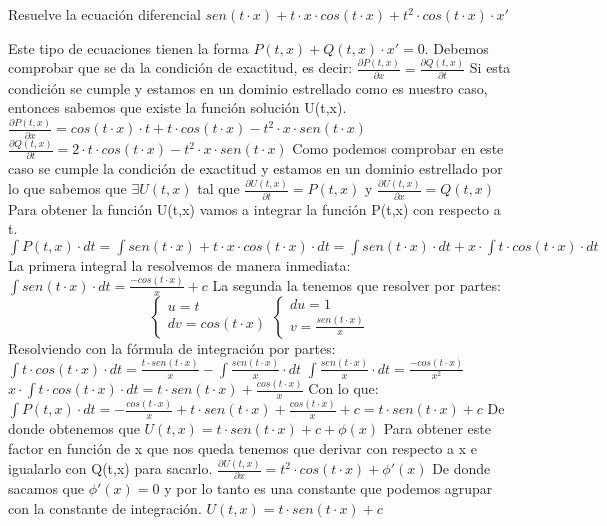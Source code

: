 \begin{ejer}
	Resuelve la ecuación diferencial $sen(t\cdot x) + t\cdot x\cdot cos(t\cdot x) + t^2\cdot cos(t\cdot x)\cdot x'$  
\end{ejer}
\begin{sol}
	Este tipo de ecuaciones tienen la forma $P(t,x) + Q(t,x)\cdot x' = 0$.  
	Debemos comprobar que se da la condición de exactitud, es decir:  
	$\frac{\partial P(t,x)}{\partial x} = \frac{\partial Q(t,x)}{\partial t}$  
	Si esta condición se cumple y estamos en un dominio estrellado como es nuestro caso, entonces sabemos que existe la función solución U(t,x).  
	$\frac{\partial P(t,x)}{\partial x} = cos(t\cdot x)\cdot t + t\cdot cos(t\cdot x) - t^2\cdot x\cdot sen(t\cdot x)$  
	$\frac{\partial Q(t,x)}{\partial t} = 2\cdot t\cdot cos(t\cdot x) - t^2\cdot x\cdot sen(t\cdot x)$  
	Como podemos comprobar en este caso se cumple la condición de exactitud y estamos en un dominio estrellado por lo que sabemos que $\exists U(t,x)$ tal que $\frac{\partial U(t,x)}{\partial t} = P(t,x)$ y $\frac{\partial U(t,x)}{\partial x} = Q(t,x)$  
	Para obtener la función U(t,x) vamos a integrar la función P(t,x) con respecto a t.  
	$\int P(t,x)\cdot dt = \int sen(t\cdot x) + t\cdot x\cdot cos(t\cdot x)\cdot dt = \int sen(t\cdot x)\cdot dt + x\cdot \int t\cdot cos(t\cdot x)\cdot dt$  
	La primera integral la resolvemos de manera inmediata:  
	$\int sen(t\cdot x)\cdot dt = \frac{-cos(t\cdot x)}{x} + c$  
	La segunda la tenemos que resolver por partes:  
	$$
	\begin{cases}
	u = t \\
	dv = cos(t\cdot x)
	\end{cases}
	\begin{cases}
	du = 1 \\
	v = \frac{sen(t\cdot x)}{x}
	\end{cases}
	$$  
	Resolviendo con la fórmula de integración por partes:  
	$\int t\cdot cos(t\cdot x)\cdot dt = \frac{t\cdot sen(t\cdot x)}{x}-\int \frac{sen(t\cdot x)}{x}\cdot dt$  
	$\int \frac{sen(t\cdot x)}{x}\cdot dt = \frac{-cos(t\cdot x)}{x^2}$  
	$x\cdot \int t\cdot cos(t\cdot x)\cdot dt = t\cdot sen(t\cdot x) + \frac{cos(t\cdot x)}{x}$  
	Con lo que:  
	$\int P(t,x)\cdot dt = -\frac{cos(t\cdot x)}{x} + t\cdot sen(t\cdot x) + \frac{cos(t\cdot x)}{x} + c = t\cdot sen(t\cdot x) + c$  
	De donde obtenemos que $U(t,x) = t\cdot sen(t\cdot x) + c + \phi (x)$  
	Para obtener este factor en función de x que nos queda tenemos que derivar con respecto a x e igualarlo con Q(t,x) para sacarlo.  
	$\frac{\partial U(t,x)}{\partial x} = t^2\cdot cos(t\cdot x) + \phi '(x)$  
	De donde sacamos que $\phi '(x) = 0$ y por lo tanto es una constante que podemos agrupar con la constante de integración.  
	$U(t,x) = t\cdot sen(t\cdot x) + c$
\end{sol}
